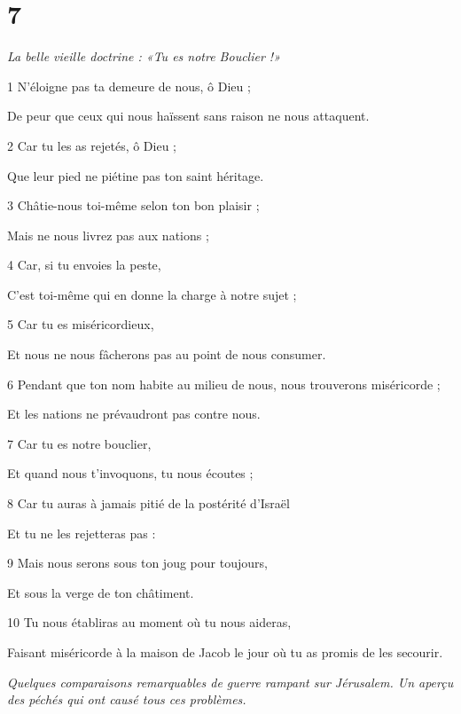 \chapter{7}

\par \textit{La belle vieille doctrine : «Tu es notre Bouclier !»}

\par 1 N'éloigne pas ta demeure de nous, ô Dieu ;
\par     De peur que ceux qui nous haïssent sans raison ne nous attaquent.
\par 2 Car tu les as rejetés, ô Dieu ;
\par     Que leur pied ne piétine pas ton saint héritage.
\par 3 Châtie-nous toi-même selon ton bon plaisir ;
\par     Mais ne nous livrez pas aux nations ;
\par 4 Car, si tu envoies la peste,
\par     C'est toi-même qui en donne la charge à notre sujet ;
\par 5 Car tu es miséricordieux,
\par     Et nous ne nous fâcherons pas au point de nous consumer.
\par   
\par 6 Pendant que ton nom habite au milieu de nous, nous trouverons miséricorde ;
\par     Et les nations ne prévaudront pas contre nous.
\par 7 Car tu es notre bouclier,
\par     Et quand nous t’invoquons, tu nous écoutes ;
\par 8 Car tu auras à jamais pitié de la postérité d'Israël
\par     Et tu ne les rejetteras pas :
\par 9 Mais nous serons sous ton joug pour toujours,
\par     Et sous la verge de ton châtiment.
\par 10 Tu nous établiras au moment où tu nous aideras,
\par     Faisant miséricorde à la maison de Jacob le jour où tu as promis de les secourir.


\par \textit{Quelques comparaisons remarquables de guerre rampant sur Jérusalem. Un aperçu des péchés qui ont causé tous ces problèmes.}

